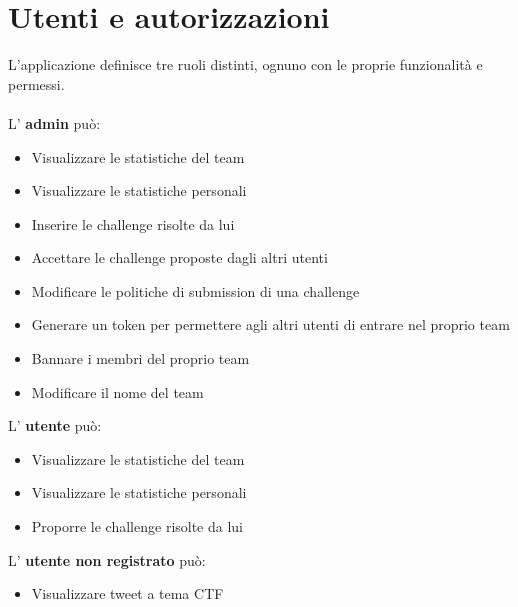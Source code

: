 \documentclass[a4paper,12pt]{extarticle}
\begin{document}




\section{Utenti e autorizzazioni}
L'applicazione definisce tre ruoli distinti, ognuno con le proprie funzionalità e permessi.\\ \\
L' \textbf{admin} può:
\begin{itemize}
    \item Visualizzare le statistiche del team
    \item Visualizzare le statistiche personali
    \item Inserire le challenge risolte da lui
    \item Accettare le challenge proposte dagli altri utenti
    \item Modificare le politiche di submission di una challenge
    \item Generare un token per permettere agli altri utenti di entrare nel proprio team
    \item Bannare i membri del proprio team
    \item Modificare il nome del team
\end{itemize}
L' \textbf{utente} può:
\begin{itemize}
    \item Visualizzare le statistiche del team
    \item Visualizzare le statistiche personali
    \item Proporre le challenge risolte da lui
\end{itemize}
L' \textbf{utente non registrato} può:
\begin{itemize}
    \item Visualizzare tweet a tema CTF
\end{itemize}
\end{document}
